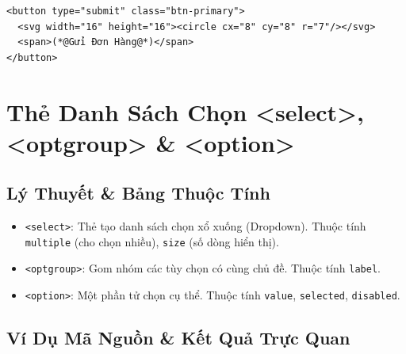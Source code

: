 \documentclass[11pt,oneside]{book}
\newcommand{\codeinline}[1]{\textcolor{accentOrange}{\texttt{#1}}}
\begin{document}
\begin{codeWindow}
\begin{lstlisting}[language=HTML5]
<button type="submit" class="btn-primary">
  <svg width="16" height="16"><circle cx="8" cy="8" r="7"/></svg>
  <span>(*@Gửi Đơn Hàng@*)</span>
</button>
\end{lstlisting}
\end{codeWindow}

\begin{browserWindow}
\sffamily\small
\begin{center}
\end{center}
\end{browserWindow}

\section{Thẻ Danh Sách Chọn <select>, <optgroup> \& <option>}
\subsection{Lý Thuyết \& Bảng Thuộc Tính}

\begin{conceptBox}
\begin{itemize}[leftmargin=1.5em, itemsep=3pt, parsep=0pt]
    \item \codeinline{<select>}: Thẻ tạo danh sách chọn xổ xuống (Dropdown). Thuộc tính \codeinline{multiple} (cho chọn nhiều), \codeinline{size} (số dòng hiển thị).
    \item \codeinline{<optgroup>}: Gom nhóm các tùy chọn có cùng chủ đề. Thuộc tính \codeinline{label}.
    \item \codeinline{<option>}: Một phần tử chọn cụ thể. Thuộc tính \codeinline{value}, \codeinline{selected}, \codeinline{disabled}.
\end{itemize}
\end{conceptBox}

\subsection{Ví Dụ Mã Nguồn \& Kết Quả Trực Quan}
\end{document}
